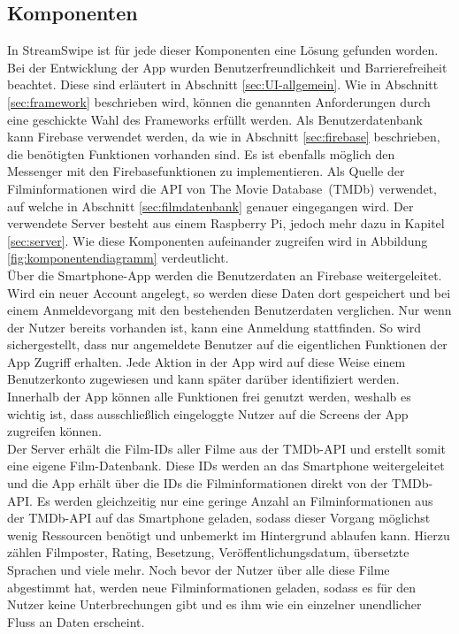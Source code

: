 \subsection{Komponenten}
\label{sec:komponenten}
In StreamSwipe ist für jede dieser Komponenten eine Lösung gefunden worden. 
Bei der Entwicklung der App wurden Benutzerfreundlichkeit und Barrierefreiheit beachtet. 
Diese sind erläutert in Abschnitt \ref{sec:UI-allgemein}.
 Wie in Abschnitt \ref{sec:framework} beschrieben wird, können die genannten Anforderungen durch eine geschickte Wahl des Frameworks erfüllt werden. Als Benutzerdatenbank kann Firebase verwendet werden, da wie in Abschnitt \ref{sec:firebase} beschrieben, die benötigten Funktionen vorhanden sind. Es ist ebenfalls möglich den Messenger mit den Firebasefunktionen zu implementieren. Als Quelle der Filminformationen wird die API von \glqq The Movie Database\grqq \, (TMDb) verwendet, auf welche in Abschnitt \ref{sec:filmdatenbank} genauer eingegangen wird. Der verwendete Server besteht aus einem Raspberry Pi, jedoch mehr dazu in Kapitel \ref{sec:server}. Wie diese Komponenten aufeinander zugreifen wird in Abbildung \ref{fig:komponentendiagramm} verdeutlicht.\\
Über die Smartphone-App werden die Benutzerdaten an Firebase weitergeleitet. Wird ein neuer Account angelegt, so werden diese Daten dort gespeichert und bei einem Anmeldevorgang mit den bestehenden Benutzerdaten verglichen. Nur wenn der Nutzer bereits vorhanden ist, kann eine Anmeldung stattfinden. So wird sichergestellt, dass nur angemeldete Benutzer auf die eigentlichen Funktionen der App Zugriff erhalten. Jede Aktion in der App wird auf diese Weise einem Benutzerkonto zugewiesen und kann später darüber identifiziert werden. Innerhalb der App können alle Funktionen frei genutzt werden, weshalb es wichtig ist, dass ausschließlich eingeloggte Nutzer auf die Screens der App zugreifen können.\\
Der Server erhält die Film-IDs aller Filme aus der TMDb-API  und erstellt somit eine eigene Film-Datenbank. Diese IDs werden an das Smartphone weitergeleitet und die App erhält über die IDs die Filminformationen direkt von der TMDb-API. Es werden gleichzeitig nur eine geringe Anzahl an Filminformationen aus der TMDb-API auf das Smartphone geladen, sodass dieser Vorgang möglichst wenig Ressourcen benötigt und unbemerkt im Hintergrund ablaufen kann. Hierzu zählen Filmposter, Rating, Besetzung, Veröffentlichungsdatum, übersetzte Sprachen und viele mehr. Noch bevor der Nutzer über alle diese Filme abgestimmt hat, werden neue Filminformationen geladen, sodass es für den Nutzer keine Unterbrechungen gibt und es ihm wie ein einzelner unendlicher Fluss an Daten erscheint. \\
